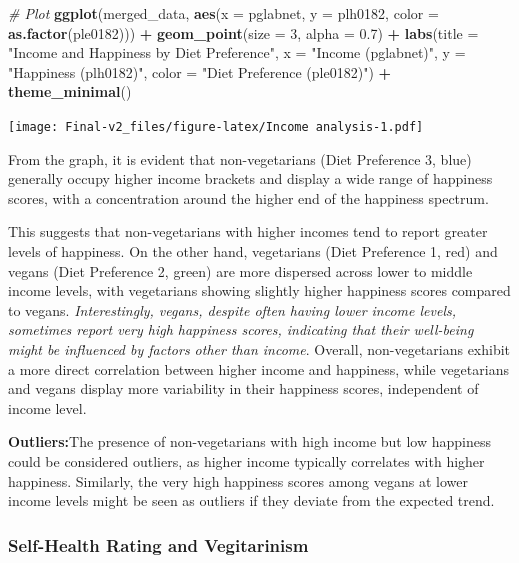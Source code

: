 \documentclass[
]{article}
\newenvironment{Shaded}{\begin{snugshade}}{\end{snugshade}}
\newcommand{\AttributeTok}[1]{\textcolor[rgb]{0.13,0.29,0.53}{#1}}
\newcommand{\CommentTok}[1]{\textcolor[rgb]{0.56,0.35,0.01}{\textit{#1}}}
\newcommand{\DecValTok}[1]{\textcolor[rgb]{0.00,0.00,0.81}{#1}}
\newcommand{\FloatTok}[1]{\textcolor[rgb]{0.00,0.00,0.81}{#1}}
\newcommand{\FunctionTok}[1]{\textcolor[rgb]{0.13,0.29,0.53}{\textbf{#1}}}
\newcommand{\NormalTok}[1]{#1}
\newcommand{\SpecialCharTok}[1]{\textcolor[rgb]{0.81,0.36,0.00}{\textbf{#1}}}
\newcommand{\StringTok}[1]{\textcolor[rgb]{0.31,0.60,0.02}{#1}}
\begin{document}
\begin{Shaded}
\begin{Highlighting}[]
\CommentTok{\# Plot}
\FunctionTok{ggplot}\NormalTok{(merged\_data, }\FunctionTok{aes}\NormalTok{(}\AttributeTok{x =}\NormalTok{ pglabnet, }\AttributeTok{y =}\NormalTok{ plh0182, }\AttributeTok{color =} \FunctionTok{as.factor}\NormalTok{(ple0182))) }\SpecialCharTok{+}
  \FunctionTok{geom\_point}\NormalTok{(}\AttributeTok{size =} \DecValTok{3}\NormalTok{, }\AttributeTok{alpha =} \FloatTok{0.7}\NormalTok{) }\SpecialCharTok{+}
  \FunctionTok{labs}\NormalTok{(}\AttributeTok{title =} \StringTok{"Income and}
\StringTok{       Happiness by Diet Preference"}\NormalTok{,}
       \AttributeTok{x =} \StringTok{"Income (pglabnet)"}\NormalTok{,}
       \AttributeTok{y =} \StringTok{"Happiness (plh0182)"}\NormalTok{,}
       \AttributeTok{color =} \StringTok{"Diet Preference (ple0182)"}\NormalTok{) }\SpecialCharTok{+}
  \FunctionTok{theme\_minimal}\NormalTok{()}
\end{Highlighting}
\end{Shaded}

\texttt{[image: Final-v2\_files/figure-latex/Income~analysis-1.pdf]}

From the graph, it is evident that non-vegetarians (Diet Preference 3,
blue) generally occupy higher income brackets and display a wide range
of happiness scores, with a concentration around the higher end of the
happiness spectrum.

This suggests that non-vegetarians with higher incomes tend to report
greater levels of happiness. On the other hand, vegetarians (Diet
Preference 1, red) and vegans (Diet Preference 2, green) are more
dispersed across lower to middle income levels, with vegetarians showing
slightly higher happiness scores compared to vegans.
\emph{Interestingly, vegans, despite often having lower income levels,
sometimes report very high happiness scores, indicating that their
well-being might be influenced by factors other than income}. Overall,
non-vegetarians exhibit a more direct correlation between higher income
and happiness, while vegetarians and vegans display more variability in
their happiness scores, independent of income level.

\textbf{Outliers:}The presence of non-vegetarians with high income but
low happiness could be considered outliers, as higher income typically
correlates with higher happiness. Similarly, the very high happiness
scores among vegans at lower income levels might be seen as outliers if
they deviate from the expected trend.

\subsubsection{Self-Health Rating and
Vegitarinism}\label{self-health-rating-and-vegitarinism}
\end{document}
